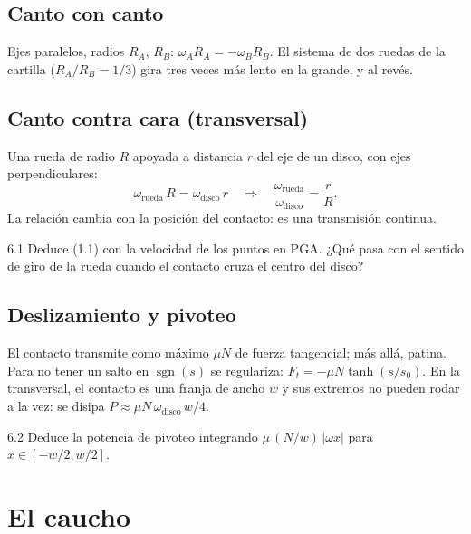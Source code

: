 \documentclass[11pt,a4paper]{article}
\begin{document}
\subsection{Canto con canto}
Ejes paralelos, radios $R_A$, $R_B$: $\omega_AR_A = -\omega_BR_B$. El sistema de dos ruedas de la cartilla
($R_A/R_B = 1/3$) gira tres veces más lento en la grande, y al revés.

\subsection{Canto contra cara (transversal)}
Una rueda de radio $R$ apoyada a distancia $r$ del eje de un disco, con ejes perpendiculares:
\begin{equation}
  \omega_{\text{rueda}}\,R = \omega_{\text{disco}}\,r \quad\Longrightarrow\quad \frac{\omega_{\text{rueda}}}{\omega_{\text{disco}}} = \frac rR .
\end{equation}
La relación cambia con la posición del contacto: es una transmisión continua.

\begin{ejercicio}{6.1}
Deduce (1.1) con la velocidad de los puntos en PGA. ¿Qué pasa con el sentido de giro de la rueda cuando el contacto
cruza el centro del disco?
\end{ejercicio}

\subsection{Deslizamiento y pivoteo}
El contacto transmite como máximo $\mu N$ de fuerza tangencial; más allá, patina. Para no tener un salto en
$\operatorname{sgn}(s)$ se regulariza: $F_t = -\mu N\tanh(s/s_0)$. En la transversal, el contacto es una franja de ancho
$w$ y sus extremos no pueden rodar a la vez: se disipa $P\approx\mu N\,\omega_{\text{disco}}\,w/4$.

\begin{ejercicio}{6.2}
Deduce la potencia de pivoteo integrando $\mu\,(N/w)\,\lvert\omega x\rvert$ para $x\in[-w/2, w/2]$.
\end{ejercicio}

\section{El caucho}
\end{document}
